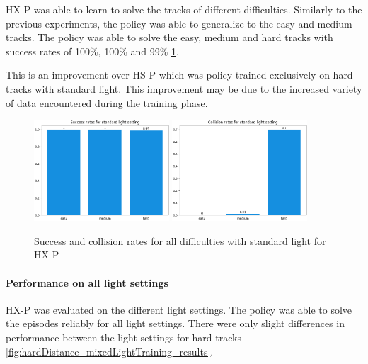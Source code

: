 \ac{HX-P} was able to learn to solve the tracks of different difficulties. Similarly to the previous experiments, the policy was able to generalize to the easy and medium tracks. The policy was able to solve the easy, medium and hard tracks with success rates of 100\%, 100\% and 99\% \ref{fig:hardDistance_mixedLight_generalization}. 

This is an improvement over \ac{HS-P} which was policy trained exclusively on hard tracks with standard light.
This improvement may be due to the increased variety of data encountered during the training phase.

\begin{figure}
    \centering
    \includegraphics[width=0.45\textwidth]{Bilder/notebook_images/hardDistanceMixedLight_eval_standard_success_rates_barplot.png}
    \includegraphics[width=0.45\textwidth]{Bilder/notebook_images/hardDistanceMixedLight_eval_standard_collision_rates_barplot.png}
    \caption{Success and collision rates for all difficulties with standard light for \ac{HX-P}}
    \label{fig:hardDistance_mixedLight_generalization}
\end{figure}

\paragraph{Performance on all light settings}

\ac{HX-P} was evaluated on the different light settings. The policy was able to solve the episodes reliably for all light settings. There were only slight differences in performance between the light settings for hard tracks \ref{fig:hardDistance_mixedLightTraining_results}.

